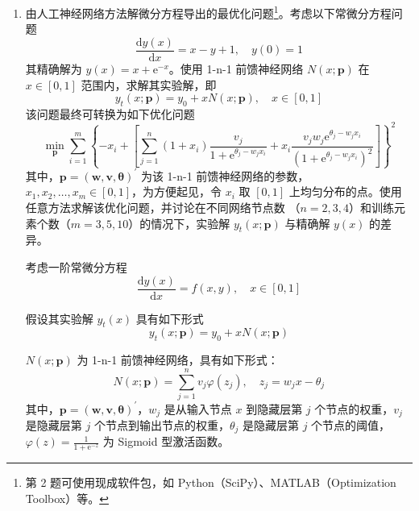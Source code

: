 \documentclass[cn,a4paper,12pt,founder,mtpro2]{elegantpaper}
\begin{document}
\begin{enumerate}
    \item 由人工神经网络方法解微分方程导出的最优化问题\footnote{第 2 题可使用现成软件包，如 Python（SciPy）、MATLAB（Optimization Toolbox）等。}。考虑以下常微分方程问题
          \begin{equation}
              \frac{\mathrm{d}y(x)}{\mathrm{d}x}=x-y+1,\quad y(0)=1
          \end{equation}
          其精确解为 $y(x)=x+\mathrm{e}^{-x}$。使用 1-n-1 前馈神经网络 $N(x;\mathbf{p})$ 在 $x\in[0,1]$ 范围内，求解其实验解，即
          \begin{equation}
              y_{t}(x;\mathbf{p})=y_0+xN(x;\mathbf{p}),\quad x\in[0,1]
          \end{equation}
          该问题最终可转换为如下优化问题
          \begin{equation}
              \min_{\mathbf{p}}\sum_{i=1}^{m}\left\{-x_{i}+\left[\sum_{j=1}^{n}\left(1+x_{i}\right)\frac{v_{j}}{1+\mathrm{e}^{\theta_{j}-w_{j}x_{i}}}+x_{i}\frac{v_{j}w_{j}\mathrm{e}^{\theta_{j}-w_{j}x_{i}}}{\left(1+\mathrm{e}^{\theta_{j}-w_{j}x_{i}}\right)^{2}}\right]\right\}^{2}
          \end{equation}
          其中，$\mathbf{p}=\left(\mathbf{w},\mathbf{v},\boldsymbol{\theta}\right)^{\prime}$ 为该 1-n-1 前馈神经网络的参数，$x_{1},x_{2},\ldots,x_{m}\in[0,1]$，为方便起见，令 $x_{i}$ 取 $[0,1]$ 上均匀分布的点。使用任意方法求解该优化问题，并讨论在不同网络节点数 （$n=2,3,4$）和训练元素个数（$m=3,5,10$）的情况下，实验解 $y_{t}(x;\mathbf{p})$ 与精确解 $y(x)$ 的差异。
          \begin{note}
              考虑一阶常微分方程
              \begin{equation}
                  \frac{\mathrm{d}y(x)}{\mathrm{d}x}=f(x,y),\quad x\in[0,1]
                  \label{eq:1ode}
              \end{equation}

              假设其实验解 $y_{t}(x)$ 具有如下形式
              \begin{equation}
                  y_{t}(x;\mathbf{p})=y_0+xN(x;\mathbf{p})
              \end{equation}

              $N(x;\mathbf{p})$ 为 1-n-1 前馈神经网络，具有如下形式：
              \begin{equation}
                  N(x;\mathbf{p})=\sum_{j=1}^{n}v_{j}\varphi(z_{j}),\quad z_{j}=w_{j}x-\theta_{j}
              \end{equation}
              其中，$\mathbf{p}=\left(\mathbf{w},\mathbf{v},\boldsymbol{\theta}\right)^{\prime}$，$w_{j}$ 是从输入节点 $x$ 到隐藏层第 $j$ 个节点的权重，$v_{j}$ 是隐藏层第 $j$ 个节点到输出节点的权重，$\theta_{j}$ 是隐藏层第 $j$ 个节点的阈值，$\varphi(z)=\frac{1}{1+\mathrm{e}^{-z}}$ 为 Sigmoid 型激活函数。


\end{note}
\end{enumerate}
\end{document}
